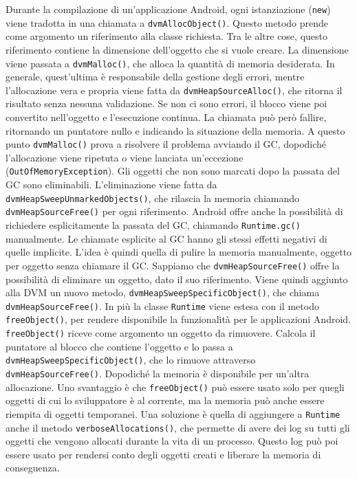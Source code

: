 Durante la compilazione di un'applicazione Android, ogni istanziazione (\texttt{new}) viene tradotta in una chiamata a \texttt{dvmAllocObject()}. Questo metodo prende come argomento un riferimento alla classe richiesta. Tra le altre cose, questo riferimento contiene la dimensione dell'oggetto che si vuole creare. La dimensione viene passata a \texttt{dvmMalloc()}, che alloca la quantità di memoria desiderata. In generale, quest'ultima è responsabile della gestione degli errori, mentre l'allocazione vera e propria viene fatta da \texttt{dvmHeapSourceAlloc()}, che ritorna il risultato senza nessuna validazione. Se non ci sono errori, il blocco viene poi convertito nell'oggetto e l'esecuzione continua. La chiamata può però fallire, ritornando un puntatore nullo e indicando la situazione della memoria. A questo punto \texttt{dvmMalloc()} prova a risolvere il problema avviando il GC, dopodiché l'allocazione viene ripetuta o viene lanciata un'eccezione (\texttt{OutOfMemoryException}). Gli oggetti che non sono marcati dopo la passata del GC sono eliminabili. L'eliminazione viene fatta da \texttt{dvmHeapSweepUnmarkedObjects()}, che rilascia la memoria chiamando \texttt{dvmHeapSourceFree()} per ogni riferimento. Android offre anche la possibilità di richiedere esplicitamente la passata del GC, chiamando \texttt{Runtime.gc()} manualmente. Le chiamate esplicite al GC hanno gli stessi effetti negativi di quelle implicite. L'idea è quindi quella di pulire la memoria manualmente, oggetto per oggetto senza chiamare il GC. Sappiamo che \texttt{dvmHeapSourceFree()} offre la possibilità di eliminare un oggetto, dato il suo riferimento. Viene quindi aggiunto alla DVM un nuovo metodo, \texttt{dvmHeapSweepSpecificObject()}, che chiama \texttt{dvmHeapSourceFree()}. In più la classe \texttt{Runtime} viene estesa con il metodo \texttt{freeObject()}, per rendere disponibile la funzionalità per le applicazioni Android. \texttt{freeObject()} riceve come argomento un oggetto da rimuovere. Calcola il puntatore al blocco che contiene l'oggetto e lo passa a \texttt{dvmHeapSweepSpecificObject()}, che lo rimuove attraverso \texttt{dvmHeapSourceFree()}. Dopodiché la memoria è disponibile per un'altra allocazione. Uno svantaggio è che \texttt{freeObject()} può essere usato solo per quegli oggetti di cui lo sviluppatore è al corrente, ma la memoria può anche essere riempita di oggetti temporanei. Una soluzione è quella di aggiungere a \texttt{Runtime} anche il metodo \texttt{verboseAllocations()}, che permette di avere dei log su tutti gli oggetti che vengono allocati durante la vita di un processo. Questo log può poi essere usato per rendersi conto degli oggetti creati e liberare la memoria di conseguenza. 

